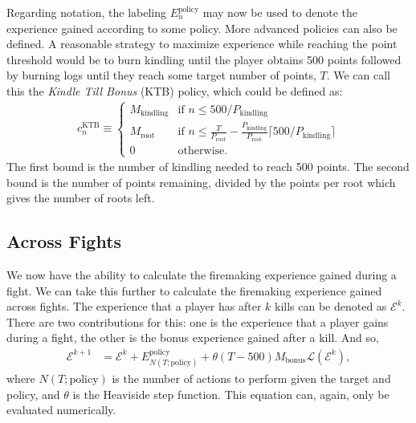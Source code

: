 		Regarding notation, the labeling $E_{n}^\text{policy}$ may now be used to denote the experience gained according to some policy. More advanced policies can also be defined. A reasonable strategy to maximize experience while reaching the point threshold would be to burn kindling until the player obtains 500 points followed by burning logs until they reach some target number of points, $T$. We can call this the \emph{Kindle Till Bonus} (KTB) policy, which could be defined as:
		\begin{align}
			c_n^\text{KTB} \equiv \begin{cases}
				M_\text{kindling} &\text{if } n \le 500/P_\text{kindling}\\
				M_\text{root} &\text{if } n \le \frac{T}{P_\text{root}} - \frac{P_\text{kindling}}{P_\text{root}}\lceil 500/P_\text{kindling} \rceil \\
				0 & \text{otherwise}.
			\end{cases}
		\end{align}
		The first bound is the number of kindling needed to reach 500 points. The second bound is the number of points remaining, divided by the points per root which gives the number of roots left.


	\subsection{Across Fights}
		We now have the ability to calculate the firemaking experience gained during a fight. We can take this further to calculate the firemaking experience gained across fights. The experience that a player has after $k$ kills can be denoted as $\mathcal{E}^k$. There are two contributions for this: one is the experience that a player gains during a fight, the other is the bonus experience gained after a kill. And so,
		\begin{align}\label{eq:experience_over_kills}
			\mathcal{E}^{k+1} &= \mathcal{E}^k + E_{N(T; \text{policy})}^\text{policy} + \theta(T - 500)M_\text{bonus}\mathcal{L}(\mathcal{E}^k),
		\end{align}
		where $N(T; \text{policy})$ is the number of actions to perform given the target and policy, and $\theta$ is the Heaviside step function. This equation can, again, only be evaluated numerically. 


